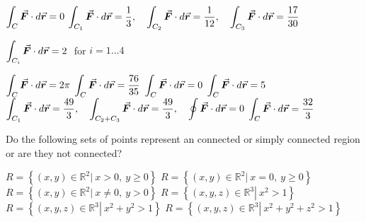 \begin{Answer}
    
        \Question $\ds \int_C \vec F\cdot d\vec r = 0$
        \Question $\ds \int_{C_1} \vec F\cdot d\vec r = \dfrac{1}{3}, \quad \ds \int_{C_2} \vec F\cdot d\vec r = \dfrac{1}{12}, \quad \ds \int_{C_3} \vec F\cdot d\vec r = \dfrac{17}{30}$
        
        \Question $\ds \int_{C_i} \vec F\cdot d\vec r = 2\ $ for $i=1\ldots4$
        
        \Question $\ds \int_C \vec F\cdot d\vec r = 2\pi$
        \Question $\ds \int_C \vec F\cdot d\vec r = \dfrac{76}{35}$
        \Question $\ds \int_C \vec F\cdot d\vec r = 0$
        \Question $\ds \int_C \vec F\cdot d\vec r= 5$
        \Question $\ds \int_{C_1} \vec F\cdot d\vec r = \dfrac{49}{3}, \quad \ds \int_{C_2+C_3} \vec F\cdot d\vec r = \dfrac{49}{3}, \quad \ds \oint \vec F\cdot d\vec r = 0$
        \Question $\ds \int_C \vec F\cdot d\vec r = \dfrac{32}{3}$
    
\end{Answer}

\begin{Exercise}[difficulty = 2] Do the following sets of points represent an connected or simply connected region or are they not connected?
\begin{multicols}{2}
		\Question $R = \left\{ (x,y) \in \mathbb{R}^2 \left| \ x > 0, \ y \geq 0  \right. \right\}$
		\Question $R = \left\{ (x,y) \in \mathbb{R}^2 \left| \ x = 0, \ y \geq 0  \right. \right\}$
		\Question $R = \left\{ (x,y) \in \mathbb{R}^2 \left| \ x \neq 0, \ y > 0  \right. \right\}$
		\Question $R = \left\{ (x,y,z) \in \mathbb{R}^3 \left| \ x^2 > 1  \right. \right\}$
		\Question $R = \left\{ (x,y,z) \in \mathbb{R}^3 \left| \ x^2 + y^2 > 1  \right. \right\}$
		\Question $R = \left\{ (x,y,z) \in \mathbb{R}^3 \left| \ x^2 + y^2 + z^2 > 1  \right. \right\}$
		\EndCurrentQuestion
\end{multicols}
\end{Exercise}

